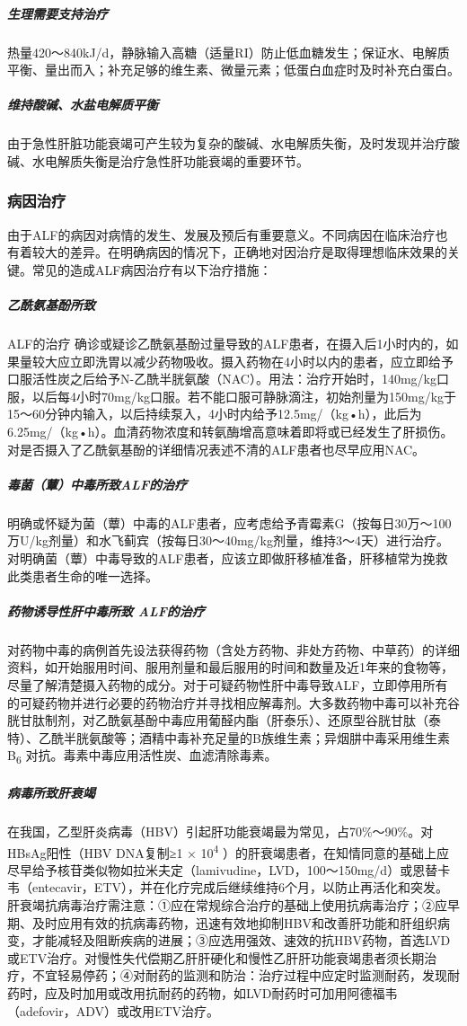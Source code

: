 \subparagraph{生理需要支持治疗}

热量420～840kJ/d，静脉输入高糖（适量RI）防止低血糖发生；保证水、电解质平衡、量出而入；补充足够的维生素、微量元素；低蛋白血症时及时补充白蛋白。

\subparagraph{维持酸碱、水盐电解质平衡}

由于急性肝脏功能衰竭可产生较为复杂的酸碱、水电解质失衡，及时发现并治疗酸碱、水电解质失衡是治疗急性肝功能衰竭的重要环节。

\subsubsection{病因治疗}

由于ALF的病因对病情的发生、发展及预后有重要意义。不同病因在临床治疗也有着较大的差异。在明确病因的情况下，正确地对因治疗是取得理想临床效果的关键。常见的造成ALF病因治疗有以下治疗措施：

\subparagraph{乙酰氨基酚所致}

ALF的治疗
确诊或疑诊乙酰氨基酚过量导致的ALF患者，在摄入后1小时内的，如果量较大应立即洗胃以减少药物吸收。摄入药物在4小时以内的患者，应立即给予口服活性炭之后给予N-乙酰半胱氨酸（NAC）。用法：治疗开始时，140mg/kg口服，以后每4小时70mg/kg口服。若不能口服可静脉滴注，初始剂量为150mg/kg于15～60分钟内输入，以后持续泵入，4小时内给予12.5mg/（kg•h），此后为6.25mg/（kg•h）。血清药物浓度和转氨酶增高意味着即将或已经发生了肝损伤。对是否摄入了乙酰氨基酚的详细情况表述不清的ALF患者也尽早应用NAC。

\subparagraph{毒菌（蕈）中毒所致ALF的治疗}

明确或怀疑为菌（蕈）中毒的ALF患者，应考虑给予青霉素G（按每日30万～100万U/kg剂量）和水飞蓟宾（按每日30～40mg/kg剂量，维持3～4天）进行治疗。对明确菌（蕈）中毒导致的ALF患者，应该立即做肝移植准备，肝移植常为挽救此类患者生命的唯一选择。

\subparagraph{药物诱导性肝中毒所致 ALF的治疗}

对药物中毒的病例首先设法获得药物（含处方药物、非处方药物、中草药）的详细资料，如开始服用时间、服用剂量和最后服用的时间和数量及近1年来的食物等，尽量了解清楚摄入药物的成分。对于可疑药物性肝中毒导致ALF，立即停用所有的可疑药物并进行必要的药物治疗并寻找相应解毒剂。大多数药物中毒可以补充谷胱甘肽制剂，对乙酰氨基酚中毒应用葡醛内酯（肝泰乐）、还原型谷胱甘肽（泰特）、乙酰半胱氨酸等；酒精中毒补充足量的B族维生素；异烟肼中毒采用维生素B\textsubscript{6}
对抗。毒素中毒应用活性炭、血滤清除毒素。

\subparagraph{病毒所致肝衰竭}

在我国，乙型肝炎病毒（HBV）引起肝功能衰竭最为常见，占70\%～90\%。对HBsAg阳性（HBV
DNA复制≥1 × 10\textsuperscript{4}
）的肝衰竭患者，在知情同意的基础上应尽早给予核苷类似物如拉米夫定（lamivudine，LVD，100～150mg/d）或恩替卡韦（entecavir，ETV），并在化疗完成后继续维持6个月，以防止再活化和突发。肝衰竭抗病毒治疗需注意：①应在常规综合治疗的基础上使用抗病毒治疗；②应早期、及时应用有效的抗病毒药物，迅速有效地抑制HBV和改善肝功能和肝组织病变，才能减轻及阻断疾病的进展；③应选用强效、速效的抗HBV药物，首选LVD或ETV治疗。对慢性失代偿期乙肝肝硬化和慢性乙肝肝功能衰竭患者须长期治疗，不宜轻易停药；④对耐药的监测和防治：治疗过程中应定时监测耐药，发现耐药时，应及时加用或改用抗耐药的药物，如LVD耐药时可加用阿德福韦（adefovir，ADV）或改用ETV治疗。

